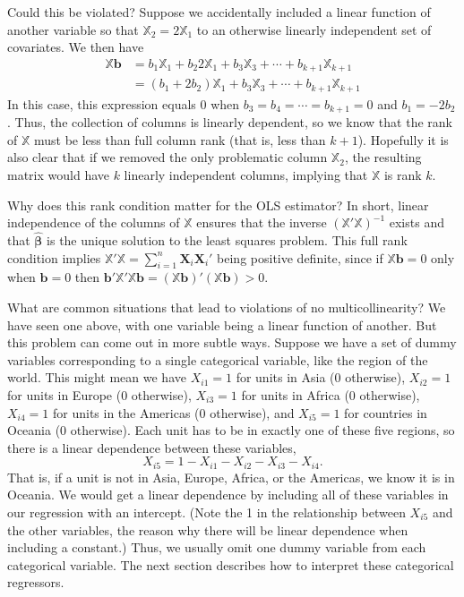 \documentclass[
  13pt,
  letterpaper,
  DIV=11,
  numbers=noendperiod]{scrreprt}
\newcommand{\mb}{\bm}
\newcommand{\X}{\mb{X}}
\newcommand{\Xmat}{\mathbb{X}}
\newcommand{\bhat}{\widehat{\mb{\beta}}}
\theoremstyle{plain}
\theoremstyle{plain}
\theoremstyle{definition}
\theoremstyle{definition}
\theoremstyle{remark}
\begin{document}
Could this be violated? Suppose we accidentally included a linear
function of another variable so that \(\mathbb{X}_2 = 2\mathbb{X}_1\) to
an otherwise linearly independent set of covariates. We then have \[ 
\begin{aligned}
  \mathbb{X}\mb{b} &= b_{1}\mathbb{X}_{1} + b_{2}2\mathbb{X}_1+ b_{3}\mathbb{X}_{3}+ \cdots + b_{k+1}\mathbb{X}_{k+1} \\
  &= (b_{1} + 2b_{2})\mathbb{X}_{1} + b_{3}\mathbb{X}_{3} + \cdots + b_{k+1}\mathbb{X}_{k+1}
\end{aligned}
\] In this case, this expression equals 0 when
\(b_3 = b_4 = \cdots = b_{k+1} = 0\) and \(b_1 = -2b_2\). Thus, the
collection of columns is linearly dependent, so we know that the rank of
\(\mathbb{X}\) must be less than full column rank (that is, less than
\(k+1\)). Hopefully it is also clear that if we removed the only
problematic column \(\mathbb{X}_2\), the resulting matrix would have
\(k\) linearly independent columns, implying that \(\mathbb{X}\) is rank
\(k\).

Why does this rank condition matter for the OLS estimator? In short,
linear independence of the columns of \(\Xmat\) ensures that the inverse
\((\Xmat'\Xmat)^{-1}\) exists and that \(\bhat\) is the unique solution
to the least squares problem. This full rank condition implies
\(\Xmat'\Xmat = \sum_{i=1}^{n}\X_{i}\X_{i}'\) being positive definite,
since if \(\mathbb{X}\mb{b} = 0\) only when \(\mb{b} = 0\) then
\(\mb{b}'\mathbb{X}'\mathbb{X}\mb{b} = (\mathbb{X}\mb{b})'(\mathbb{X}\mb{b}) > 0\).

What are common situations that lead to violations of no
multicollinearity? We have seen one above, with one variable being a
linear function of another. But this problem can come out in more subtle
ways. Suppose we have a set of dummy variables corresponding to a single
categorical variable, like the region of the world. This might mean we
have \(X_{i1} = 1\) for units in Asia (0 otherwise), \(X_{i2} = 1\) for
units in Europe (0 otherwise), \(X_{i3} = 1\) for units in Africa (0
otherwise), \(X_{i4} = 1\) for units in the Americas (0 otherwise), and
\(X_{i5} = 1\) for countries in Oceania (0 otherwise). Each unit has to
be in exactly one of these five regions, so there is a linear dependence
between these variables, \[ 
X_{i5} = 1 - X_{i1} - X_{i2} - X_{i3} - X_{i4}.
\] That is, if a unit is not in Asia, Europe, Africa, or the Americas,
we know it is in Oceania. We would get a linear dependence by including
all of these variables in our regression with an intercept. (Note the 1
in the relationship between \(X_{i5}\) and the other variables, the
reason why there will be linear dependence when including a constant.)
Thus, we usually omit one dummy variable from each categorical variable.
The next section describes how to interpret these categorical
regressors.
\end{document}
